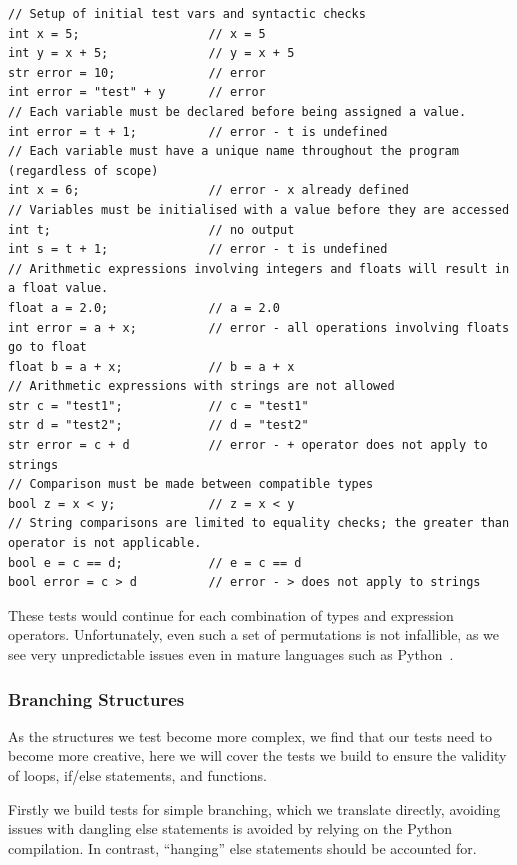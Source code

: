\begin{lstlisting}[caption={Testing that variable declaration and type checking work},captionpos=b, label={lst:lattice-typing-test}]
// Setup of initial test vars and syntactic checks
int x = 5;                  // x = 5
int y = x + 5;              // y = x + 5
str error = 10;             // error
int error = "test" + y      // error
// Each variable must be declared before being assigned a value.
int error = t + 1;          // error - t is undefined
// Each variable must have a unique name throughout the program (regardless of scope)
int x = 6;                  // error - x already defined
// Variables must be initialised with a value before they are accessed
int t;                      // no output
int s = t + 1;              // error - t is undefined
// Arithmetic expressions involving integers and floats will result in a float value.
float a = 2.0;              // a = 2.0
int error = a + x;          // error - all operations involving floats go to float
float b = a + x;            // b = a + x
// Arithmetic expressions with strings are not allowed
str c = "test1";            // c = "test1"
str d = "test2";            // d = "test2"
str error = c + d           // error - + operator does not apply to strings
// Comparison must be made between compatible types
bool z = x < y;             // z = x < y
// String comparisons are limited to equality checks; the greater than operator is not applicable.
bool e = c == d;            // e = c == d
bool error = c > d          // error - > does not apply to strings
\end{lstlisting}

These tests would continue for each combination of types and expression operators.
Unfortunately, even such a set of permutations is not infallible, as we see very unpredictable issues even in mature
languages such as Python~\cite{PythonIssue}.

\subsubsection{Branching Structures}
As the structures we test become more complex, we find that our tests need to become more creative, here we will
cover the tests we build to ensure the validity of loops, if/else statements, and functions.

Firstly we build tests for simple branching, which we translate directly, avoiding issues with dangling else statements
is avoided by relying on the Python compilation.
In contrast, ``hanging'' else statements should be accounted for.

